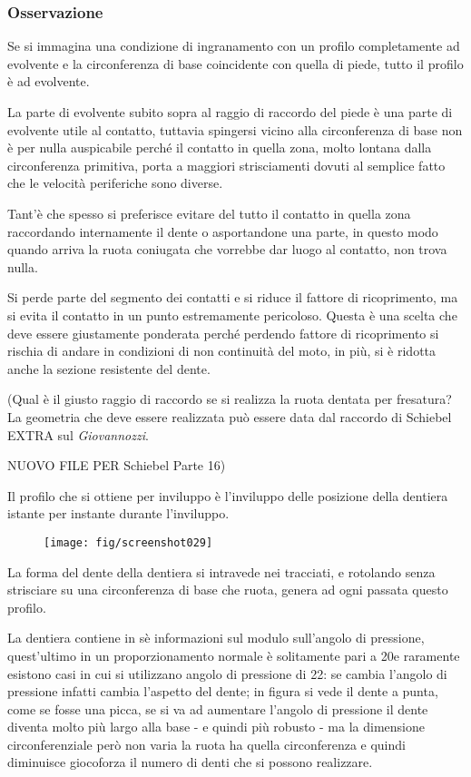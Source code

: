 \documentclass[a4paper, 15pt]{article}
\begin{document}
\subsubsection{Osservazione}
\begin{adjustwidth}{2in}{}		
		Se si immagina una condizione di ingranamento con un profilo completamente ad evolvente e la circonferenza di base coincidente con quella di piede, tutto il profilo è ad evolvente.
		
		La parte di evolvente subito sopra al raggio di raccordo del piede è una parte di evolvente utile al contatto, tuttavia spingersi vicino alla circonferenza di base non è per nulla auspicabile perché il contatto in quella zona, molto lontana dalla circonferenza primitiva, porta a maggiori strisciamenti dovuti al semplice fatto che le velocità periferiche sono diverse.
		
		Tant'è che spesso si preferisce evitare del tutto il contatto in quella zona raccordando internamente il dente o asportandone una parte, in questo modo quando arriva la ruota coniugata che vorrebbe dar luogo al contatto, non trova nulla.
		
		Si perde parte del segmento dei contatti e si riduce il fattore di ricoprimento, ma si evita il contatto in un punto estremamente pericoloso. Questa è una scelta che deve essere giustamente ponderata perché perdendo fattore di ricoprimento si rischia di andare in condizioni di non continuità del moto, in più, si è ridotta anche la sezione resistente del dente. \newline
		
		(Qual è il giusto raggio di raccordo se si realizza la ruota dentata per fresatura? La geometria che deve essere realizzata può essere data dal raccordo di Schiebel EXTRA sul \textit{Giovannozzi}. 
		
		NUOVO FILE PER Schiebel Parte 16)
\newpage
		
		Il profilo che si ottiene per inviluppo è l'inviluppo delle posizione della dentiera istante per instante durante l'inviluppo.
		\begin{figure}[H]
			\centering
			\texttt{[image: fig/screenshot029]}
			\label{fig:screenshot029}
		\end{figure}		
		La forma del dente della dentiera si intravede nei tracciati, e rotolando senza strisciare su una circonferenza di base che ruota, genera ad ogni passata questo profilo. 
		 
		La dentiera contiene in sè informazioni sul modulo sull'angolo di pressione, quest'ultimo in un proporzionamento normale è solitamente pari a 20\degree e raramente esistono casi in cui si utilizzano angolo di pressione di 22\degree: se cambia l'angolo di pressione infatti cambia l'aspetto del dente; in figura si vede il dente a punta, come se fosse una picca, se si va ad aumentare l'angolo di pressione il dente diventa molto più largo alla base - e quindi più robusto - ma la dimensione circonferenziale però non varia la ruota ha quella circonferenza e quindi diminuisce giocoforza il numero di denti che si possono realizzare. 
		 

\end{adjustwidth}
\end{document}
